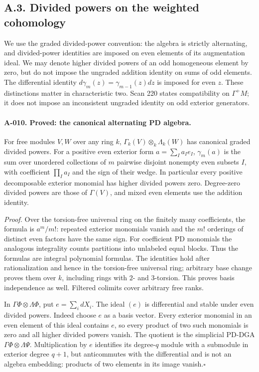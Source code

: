 \subsection{A.3. Divided powers on the weighted cohomology}

We use the graded divided-power convention: the algebra is strictly
alternating, and divided-power identities are imposed on even elements
of its augmentation ideal. We may denote higher divided powers of an
odd homogeneous element by zero, but do not impose the ungraded
addition identity on sums of odd elements. The differential identity
$d\gamma_m(z)=\gamma_{m-1}(z)dz$ is imposed for even $z$.
These distinctions matter in characteristic two. Scan 220 states
compatibility on $\Gamma^+M$; it does not impose an inconsistent
ungraded identity on odd exterior generators.

\paragraph{A-010. Proved: the canonical alternating PD algebra.}
For free modules $V,W$ over any ring $k$,
$\Gamma_k(V)\otimes_k\Lambda_k(W)$ has canonical graded divided
powers. For a positive even exterior form $a=\sum_I a_I e_I$,
$\gamma_m(a)$ is the sum over unordered collections of $m$ pairwise
disjoint nonempty even subsets $I$, with coefficient $\prod_I a_I$
and the sign of their wedge. In particular every positive decomposable
exterior monomial has higher divided powers zero. Degree-zero divided
powers are those of $\Gamma(V)$, and mixed even elements use the
addition identity.

\emph{Proof.}
Over the torsion-free universal ring on the finitely many coefficients,
the formula is $a^m/m!$: repeated exterior monomials vanish and the
$m!$ orderings of distinct even factors have the same sign.
For coefficient PD monomials the analogous integrality counts
partitions into unlabeled equal blocks. Thus the formulas are integral
polynomial formulas. The identities hold after rationalization and
hence in the torsion-free universal ring; arbitrary base change proves
them over $k$, including rings with $2$- and $3$-torsion. This proves
basis independence as well. Filtered colimits cover arbitrary free
ranks.

In $\Gamma\Phi\otimes\Lambda\Phi$, put $e=\sum_i dX_i$.
The ideal $(e)$ is differential and stable under even divided powers.
Indeed choose $e$ as a basis vector. Every exterior monomial in an
even element of this ideal contains $e$, so every product of two such
monomials is zero and all higher divided powers vanish. The quotient
is the simplicial PD-DGA $\Gamma\Phi\otimes\Lambda\Psi$.
Multiplication by $e$ identifies its degree-$q$ module with a submodule
in exterior degree $q+1$, but anticommutes with the differential and
is not an algebra embedding: products of two elements in its image
vanish.\hfill$\square$

